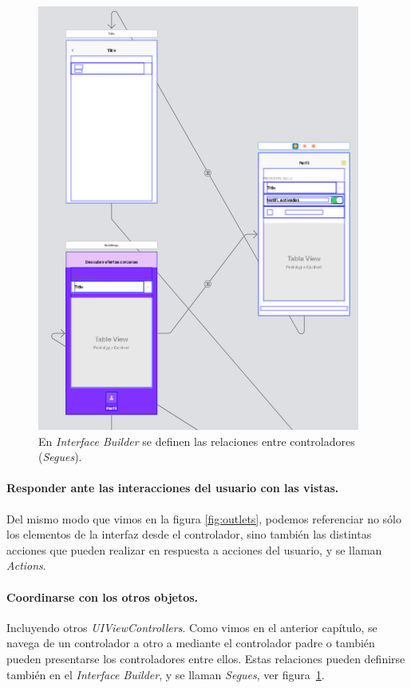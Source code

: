\begin{figure}[tb]
\centering
\includegraphics[scale=0.2]{figures/segues.png}
\caption{En \textit{Interface Builder} se definen las relaciones entre controladores (\textit{Segues}). \label{fig:segues}}
\end{figure}

\paragraph{Responder ante las interacciones del usuario con las vistas.} Del mismo modo que vimos en la figura \ref{fig:outlets}, podemos referenciar no sólo los elementos de la interfaz desde el controlador, sino también las distintas acciones que pueden realizar en respuesta a acciones del usuario, y se llaman \textit{Actions}.

\paragraph{Coordinarse con los otros objetos.} Incluyendo otros \textit{UIViewControllers}. Como vimos en el anterior capítulo, se navega de un controlador a otro a mediante el controlador padre o también pueden presentarse los controladores entre ellos. Estas relaciones pueden definirse también en el \textit{Interface Builder}, y se llaman \textit{Segues}, ver figura~\ref{fig:segues}.

























